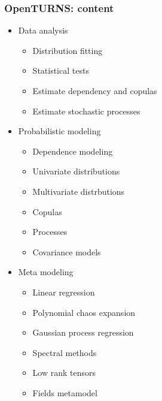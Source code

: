 \documentclass{beamer}
\begin{document}
\begin{frame}[containsverbatim]
  \frametitle{OpenTURNS: content}
  
  \begin{scriptsize}
  
  \begin{minipage}[t]{0.33\textwidth}
  \begin{itemize}
  \item Data analysis
  \begin{itemize}
  \tiny
  \item Distribution fitting
  \item Statistical tests
  \item Estimate dependency and copulas
  \item Estimate stochastic processes
  \end{itemize}
  \end{itemize}
  \end{minipage}%
  \begin{minipage}[t]{0.33\textwidth}
  \begin{itemize}
  \item Probabilistic modeling
  \begin{itemize}
  \tiny
  \item Dependence modeling
  \item Univariate distributions
  \item Multivariate distrbutions
  \item Copulas
  \item Processes 
  \item Covariance models
  \end{itemize}
  \end{itemize}
  \end{minipage}%
  \begin{minipage}[t]{0.33\textwidth}
  \begin{itemize}
  \item Meta modeling
  \begin{itemize}
  \tiny
  \item Linear regression
  \item Polynomial chaos expansion
  \item Gaussian  process regression
  \item Spectral methods
  \item Low rank tensors
  \item Fields metamodel
  \end{itemize}
  \end{itemize}
  \end{minipage}
  

\end{scriptsize}
\end{frame}
\end{document}
